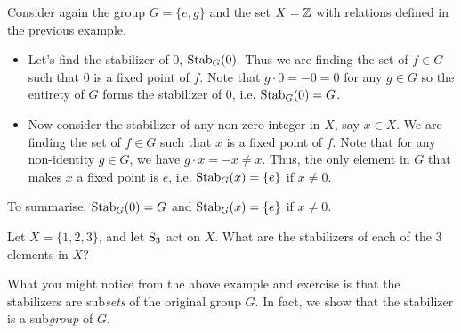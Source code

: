 \begin{example}
    Consider again the group $G = \{e, g\}$ and the set $X = \mathbb{Z}$ with relations defined in the previous example.
    \begin{itemize}
        \item Let's find the stabilizer of 0, $\mathrm{Stab}_{G}(0)$. Thus we are finding the set of $f \in G$ such that 0 is a fixed point of $f$. Note that $g \cdot 0 = -0 = 0$ for any $g \in G$ so the entirety of $G$ forms the stabilizer of 0, i.e. $\mathrm{Stab}_{G}(0) = G$.
        \item Now consider the stabilizer of any non-zero integer in $X$, say $x \in X$. We are finding the set of $f \in G$ such that $x$ is a fixed point of $f$. Note that for any non-identity $g \in G$, we have $g \cdot x = -x \neq x$. Thus, the only element in $G$ that makes $x$ a fixed point is $e$, i.e. $\mathrm{Stab}_{G}(x) = \{e\}$ if $x \neq 0$.
    \end{itemize}
    To summarise, $\mathrm{Stab}_{G}(0) = G$ and $\mathrm{Stab}_{G}(x) = \{e\}$ if $x \neq 0$.
\end{example}

\newpage

\begin{exercise}
    Let $X = \{1, 2, 3\}$, and let $\mathrm{S}_{3}$ act on $X$. What are the stabilizers of each of the 3 elements in $X$?
\end{exercise}

What you might notice from the above example and exercise is that the stabilizers are sub\textit{sets} of the original group $G$. In fact, we show that the stabilizer is a sub\textit{group} of $G$.


